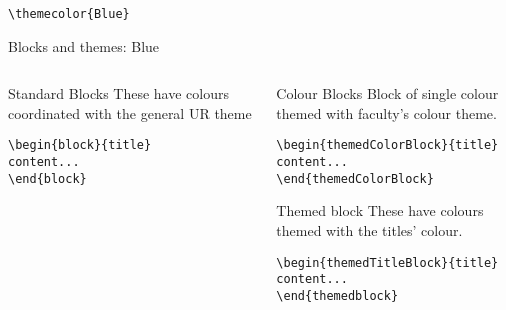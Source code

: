 \begingroup
{}
\begin{center}\verb|\themecolor{Blue}|\end{center}
\begin{frame}[fragile]{Blocks and themes: Blue}
\begin{columns} %
\begin{column}{0.3\textwidth}
\begin{block}{Standard Blocks}
These have colours coordinated with the general UR theme
\begin{verbatim}
\begin{block}{title}
content...
\end{block}
\end{verbatim}
\end{block}
\end{column}
\begin{column}{0.7\textwidth}
\begin{themedColorBlock}{Colour Blocks}
Block of single colour themed with faculty's colour theme.
\small
\begin{verbatim}
\begin{themedColorBlock}{title}
content...
\end{themedColorBlock}
\end{verbatim}
\end{themedColorBlock}
\begin{themedTitleBlock} {Themed block}
These have colours themed with the titles' colour.
\small
\begin{verbatim}
\begin{themedTitleBlock}{title}
content...
\end{themedblock}
\end{verbatim}
\end{themedTitleBlock}
\end{column}
\end{columns}
\end{frame}
\endgroup